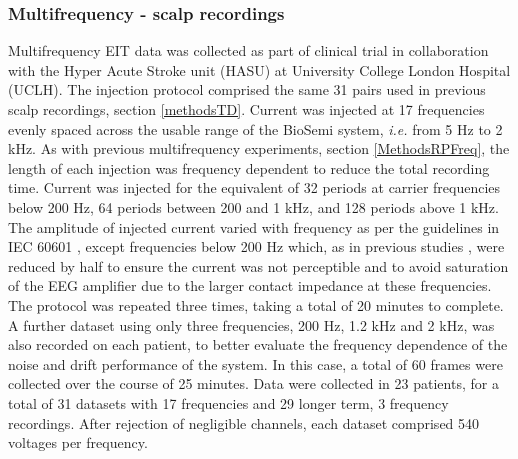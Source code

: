 \subsubsection{Multifrequency - scalp recordings}

Multifrequency EIT data was collected as part of clinical trial in collaboration with the Hyper Acute Stroke unit (HASU) at University College London Hospital (UCLH). The injection protocol comprised the same 31 pairs used in previous scalp recordings, section \ref{methodsTD}.  Current was injected at 17 frequencies evenly spaced across the usable range of the BioSemi system, \emph{i.e.} from 5 Hz to 2 kHz. As with previous multifrequency experiments, section \ref{MethodsRPFreq}, the length of each injection was frequency dependent to reduce the total recording time. Current was injected for the equivalent of 32 periods at carrier frequencies below 200 Hz, 64 periods between 200 and 1 kHz, and 128 periods above 1 kHz. The amplitude of injected current varied with frequency as per the guidelines in IEC 60601 \cite{IEC}, except frequencies below 200 Hz which, as in previous studies \cite{McEwan_2006}, were reduced by half to ensure the current was not perceptible and to avoid saturation of the EEG amplifier due to the larger contact impedance at these frequencies. The protocol was repeated three times, taking a total of 20 minutes to complete. A further dataset using only three frequencies, 200 Hz, 1.2 kHz and 2 kHz, was also recorded on each patient, to better evaluate the frequency dependence of the noise and drift performance of the system. In this case, a total of 60 frames were collected over the course of 25 minutes. Data were collected in 23 patients, for a total of 31 datasets with 17 frequencies and 29 longer term, 3 frequency recordings. After rejection of negligible channels, each dataset comprised 540 voltages per frequency.  